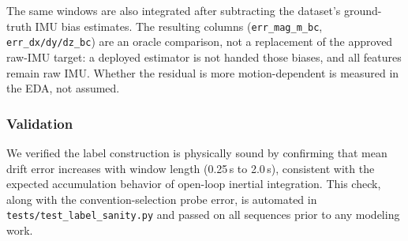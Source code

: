 The same windows are also integrated after subtracting the dataset's
ground-truth IMU bias estimates. The resulting columns
(\texttt{err\_mag\_m\_bc}, \texttt{err\_dx/dy/dz\_bc}) are an oracle
comparison, not a replacement of the approved raw-IMU target: a deployed
estimator is not handed those biases, and all features remain raw IMU.
Whether the residual is more motion-dependent is measured in the EDA,
not assumed.

\subsubsection{Validation}
We verified the label construction is physically sound by confirming
that mean drift error increases with window length (0.25\,s to 2.0\,s),
consistent with the expected accumulation behavior of open-loop inertial
integration. This check, along with the convention-selection probe
error, is automated in \texttt{tests/test\_label\_sanity.py} and passed
on all sequences prior to any modeling work.
